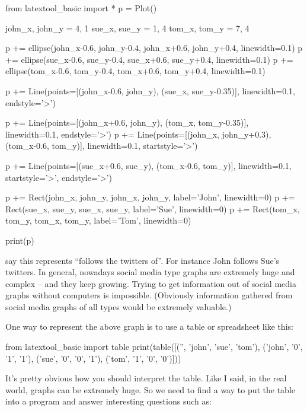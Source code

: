\begin{python}
from latextool_basic import *
p = Plot()

john_x, john_y = 4, 1
sue_x, sue_y = 1, 4
tom_x, tom_y = 7, 4

p += ellipse(john_x-0.6, john_y-0.4, john_x+0.6, john_y+0.4, linewidth=0.1)
p += ellipse(sue_x-0.6, sue_y-0.4, sue_x+0.6, sue_y+0.4, linewidth=0.1)
p += ellipse(tom_x-0.6, tom_y-0.4, tom_x+0.6, tom_y+0.4, linewidth=0.1)

p += Line(points=[(john_x-0.6, john_y), (sue_x, sue_y-0.35)], linewidth=0.1, endstyle='>')

p += Line(points=[(john_x+0.6, john_y), (tom_x, tom_y-0.35)], linewidth=0.1, endstyle='>')
p += Line(points=[(john_x, john_y+0.3), (tom_x-0.6, tom_y)], linewidth=0.1, startstyle='>')

p += Line(points=[(sue_x+0.6, sue_y), (tom_x-0.6, tom_y)], linewidth=0.1, startstyle='>', endstyle='>')

p += Rect(john_x, john_y, john_x, john_y, label='John', linewidth=0)
p += Rect(sue_x, sue_y, sue_x, sue_y, label='Sue', linewidth=0)
p += Rect(tom_x, tom_y, tom_x, tom_y, label='Tom', linewidth=0)

print(p)
\end{python}

say this represents ``follows the twitters of''. For instance John follows Sue's twitters. In general, nowadays social media type graphs are extremely huge and complex -- and they keep growing. Trying to get information out of social media graphs without computers is impossible. (Obviously information gathered from social media graphs of all types would be extremely valuable.)

One way to represent the above graph is to use a table or spreadsheet like this:

\begin{python}
from latextool_basic import table
print(table([('', 'john', 'sue', 'tom'), ('john', '0', '1', '1'), ('sue', '0', '0', '1'), ('tom', '1', '0', '0')]))
\end{python}

It's pretty obvious how you should interpret the table. Like I said, in the real world, graphs can be extremely huge. So we need to find a way to put the table into a program and answer interesting questions such as:

